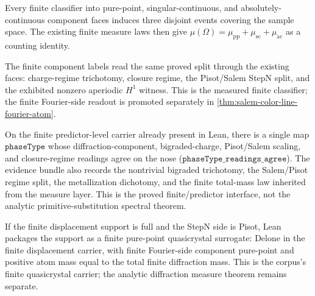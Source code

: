 \begin{theorem}\label{thm:finite-diffraction-decomposition-mass}\leanok{}
Every finite classifier into pure-point, singular-continuous, and
absolutely-continuous component faces induces three disjoint events covering the
sample space.  The existing finite measure laws then give
\(\mu(\Omega)=\mu_{\mathrm{pp}}+\mu_{\mathrm{sc}}+\mu_{\mathrm{ac}}\) as a
counting identity.
\end{theorem}

\begin{theorem}\label{thm:finite-diffraction-classifier-agreement}\leanok{}
The finite component labels read the same proved split through the existing
faces: charge-regime trichotomy, closure regime, the Pisot/Salem StepN split,
and the exhibited nonzero aperiodic \(H^1\) witness.  This is the measured
finite classifier; the finite Fourier-side readout is promoted separately in
\cref{thm:salem-color-line-fourier-atom}.
\end{theorem}

\begin{theorem}\label{thm:finite-predictor-phase-type}\leanok{}
On the finite predictor-level carrier already present in Lean, there is a
single map \(\texttt{phaseType}\) whose diffraction-component, bigraded-charge,
Pisot/Salem scaling, and closure-regime readings agree on the nose
(\(\texttt{phaseType\_readings\_agree}\)).  The evidence bundle also records the
nontrivial bigraded trichotomy, the Salem/Pisot regime split, the metallization
dichotomy, and the finite total-mass law inherited from the measure layer.  This
is the proved finite/predictor interface, not the analytic primitive-substitution
spectral theorem.
\end{theorem}

\begin{theorem}\label{thm:finite-pure-point-quasicrystal}\leanok{}
If the finite displacement support is full and the StepN side is Pisot, Lean
packages the support as a finite pure-point quasicrystal surrogate: Delone in
the finite displacement carrier, with finite Fourier-side component
pure-point and positive atom mass equal to the total finite diffraction mass.
This is the corpus's finite quasicrystal carrier; the analytic diffraction
measure theorem remains separate.
\end{theorem}

